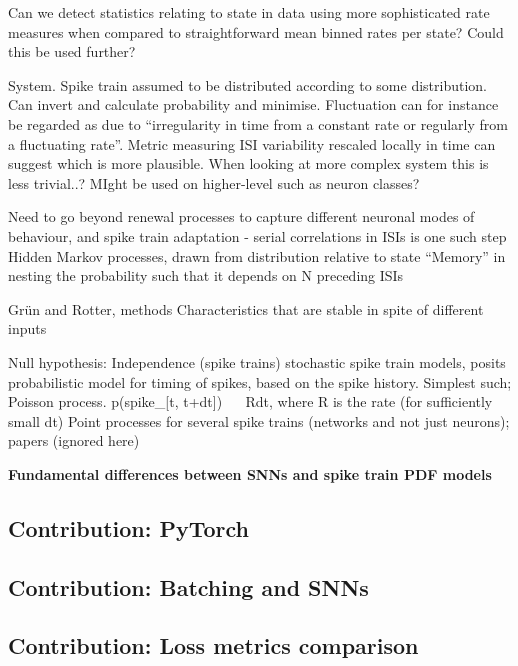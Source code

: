 \documentclass[mphil,deptreport,ai]{infthesis} %
\begin{document}

Can we detect statistics relating to state in data using more sophisticated rate measures when compared to straightforward mean binned rates per state? Could this be used further?

System. Spike train assumed to be distributed according to some distribution. Can invert and calculate probability and minimise. Fluctuation can for instance be regarded as due to “irregularity in time from a constant rate or regularly from a fluctuating rate”.
Metric measuring ISI variability rescaled locally in time can suggest which is more plausible.
When looking at more complex system this is less trivial..? MIght be used on higher-level such as neuron classes?

Need to go beyond renewal processes to capture different neuronal modes of behaviour, and spike train adaptation - serial correlations in ISIs is one such step
Hidden Markov processes, drawn from distribution relative to state
“Memory” in nesting the probability such that it depends on N preceding ISIs

Grün and Rotter, methods
Characteristics that are stable in spite of different inputs

Null hypothesis: Independence (spike trains)
stochastic spike train models, posits probabilistic model for timing of spikes, based on the spike history. Simplest such; Poisson process.
p(spike\_[t, t+dt]) ~~ Rdt, where R is the rate (for sufficiently small dt)
Point processes for several spike trains (networks and not just neurons); papers (ignored here)

\textbf{Fundamental differences between SNNs and spike train PDF models}

\subsection{Contribution: PyTorch}

\subsection{Contribution: Batching and SNNs}

\subsection{Contribution: Loss metrics comparison}
\end{document}
